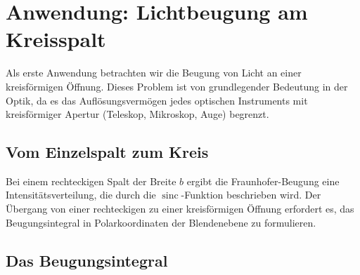 %
%
%
%
\section{Anwendung: Lichtbeugung am Kreisspalt
\label{bessel:section:beugung}}

Als erste Anwendung betrachten wir die Beugung von Licht an einer kreisförmigen Öffnung.
Dieses Problem ist von grundlegender Bedeutung in der Optik, da es das Auflösungsvermögen jedes optischen Instruments mit kreisförmiger Apertur (Teleskop, Mikroskop, Auge) begrenzt.

\subsection{Vom Einzelspalt zum Kreis
\label{bessel:subsection:vomspalt}}

Bei einem rechteckigen Spalt der Breite $b$ ergibt die Fraunhofer-Beugung eine Intensitätsverteilung, die durch die $\operatorname{sinc}$-Funktion beschrieben wird.
Der Übergang von einer rechteckigen zu einer kreisförmigen Öffnung erfordert es, das Beugungsintegral in Polarkoordinaten der Blendenebene zu formulieren.

\subsection{Das Beugungsintegral
\label{bessel:subsection:beugungsintegral}}

